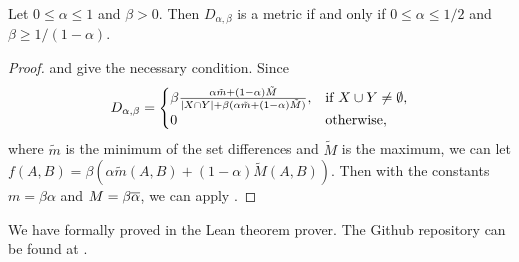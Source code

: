 		\begin{theorem}\label{main}
			Let $0\le\alpha\le 1$ and $\beta> 0$.
			Then $D_{\alpha,\beta}$ is a metric if and only if $0\le\alpha\le 1/2$ and $\beta\ge 1/(1-\alpha)$.
		\end{theorem}
		\begin{proof}
		 and  give the necessary condition. Since
			\[
			D_{\alpha,\beta} = 
			\begin{cases}
				\beta \frac{\alpha \tilde m + (1-\alpha)\tilde M}{\lvert X\cap Y\rvert+\beta(\alpha \tilde m + (1-\alpha)\tilde M)}, & \text{if }X\cup Y\ne\emptyset,\\
				0 & \text{otherwise},
			\end{cases}
			\]
			where $\tilde m$ is the minimum of the set differences and $\tilde M$ is the maximum,
			we can let $f(A,B)=\beta(\alpha \tilde m(A,B)+(1-\alpha)\tilde M(A,B))$.
			Then with the constants $m=\beta\alpha$ and $M=\beta\overline{\alpha}$, we can apply .
		\end{proof}

		We have formally proved  in the Lean theorem prover.
		The Github repository can be found at \cite{git}.

